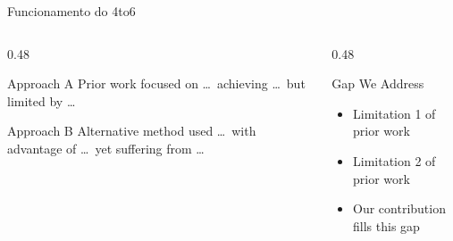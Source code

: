 \documentclass[aspectratio=169]{beamer}
\begin{document}
\begin{frame}{Funcionamento do 4to6}
  \begin{columns}[T]
    \begin{column}{0.48\textwidth}
      \begin{block}{Approach A}
        Prior work focused on \ldots\ achieving \ldots\ but limited by \ldots
      \end{block}
      \vspace{0.5em}
      \begin{block}{Approach B}
        Alternative method used \ldots\ with advantage of \ldots\ yet suffering from \ldots
      \end{block}
    \end{column}
    \begin{column}{0.48\textwidth}
      \begin{block}{Gap We Address}
        \begin{itemize}
          \item Limitation 1 of prior work
          \item Limitation 2 of prior work
          \item Our contribution fills this gap
        \end{itemize}
      \end{block}
    \end{column}
  \end{columns}
\end{frame}
\end{document}
